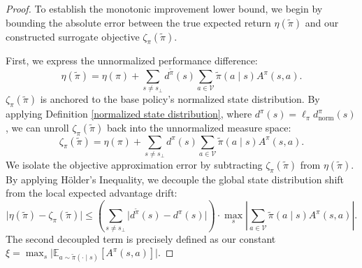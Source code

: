 \documentclass{article}
\theoremstyle{plain}
\theoremstyle{definition}
\theoremstyle{remark}
\begin{document}
\begin{proof}
	To establish the monotonic improvement lower bound, we begin by bounding the absolute error between the true expected return $\eta(\tilde{\pi})$ and our constructed surrogate objective $\zeta_\pi(\tilde{\pi})$.
	
	First, we express the unnormalized performance difference:
	\begin{equation}
		\eta(\tilde{\pi}) = \eta(\pi)+\sum_{s \neq s_\bot} d^{\tilde{\pi}}(s) \sum_{a \in \mathcal{V}} \tilde{\pi}(a \mid s) A^\pi(s, a).
	\end{equation}
	$\zeta_\pi(\tilde{\pi})$ is anchored to the base policy's normalized state distribution. By applying Definition \ref{normalized state distribution}, where $d^\pi(s) = \ell_\pi d^\pi_{\mathrm{norm}}(s)$, we can unroll $\zeta_\pi(\tilde{\pi})$ back into the unnormalized measure space:
	\begin{equation}
		\zeta_\pi(\tilde{\pi}) = \eta(\pi) + \sum_{s \neq s_\bot} d^\pi(s) \sum_{a \in \mathcal{V}} \tilde{\pi}(a \mid s) A^\pi(s, a).
	\end{equation}
	We isolate the objective approximation error by subtracting $\zeta_\pi(\tilde{\pi})$ from $\eta(\tilde{\pi})$. By applying Hölder's Inequality, we decouple the global state distribution shift from the local expected advantage drift:
	\begin{equation}\label{decoupled objective approximation error}
		\lvert \eta(\tilde{\pi}) - \zeta_\pi(\tilde{\pi}) \rvert \leq \left( \sum_{s \neq s_\bot} \lvert d^{\tilde{\pi}}(s) - d^\pi(s) \rvert \right) \cdot \max_s \left\lvert \sum_{a \in \mathcal{V}} \tilde{\pi}(a \mid s) A^\pi(s, a) \right\rvert.
	\end{equation}
	The second decoupled term is precisely defined as our constant $\xi=\max_{s}\lvert\mathbb{E}_{a\sim\tilde{\pi}(\cdot\mid s)}\left[A^\pi(s,a)\right]\rvert$.
	

\end{proof}
\end{document}
